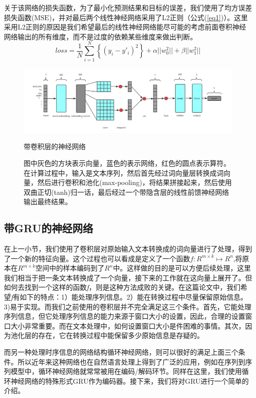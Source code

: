 \documentclass[12pt]{template}
\begin{document}
关于该网络的损失函数，为了最小化预测结果和目标的误差，我们使用了均方误差损失函数($\mathrm{MSE}$)，并对最后两个线性神经网络采用了L2正则（公式(\ref{eq1})）。这里采用L2正则的原因是我们希望最后的线性神经网络能尽可能的考虑前面卷积神经网络输出的所有维度，而不是过度的依赖某些维度来做出判断。
\begin{equation}\label{eq1}
loss=\frac{1}{N}\displaystyle\sum_{i=1}^{N}\left\{(y_i-y'_i)^2\right\}+\alpha||w_0^2||+\beta||w_1^2||
\end{equation}
\begin{figure}[htb]
    \centering
    \includegraphics[width=16cm]{conv_ranker.png}
    \caption{带卷积层的神经网络}
    \captionsetup{font=footnotesize,margin=30pt}\caption*{图中灰色的方块表示向量，蓝色的表示网络，红色的圆点表示算符。在计算过程中，输入是文本序列，然后首先经过词向量层转换成词向量，然后进行卷积和池化(max-pooling)，将结果拼接起来，然后使用双曲正切(tanh)归一话，最后经过一个带隐含层的线性前馈神经网络输出最终结果。}
    \label{f21}
\end{figure} 

\subsection{带GRU的神经网络}
在上一小节，我们使用了卷积层对原始输入文本转换成的词向量进行了处理，得到了一个新的特征向量。这个过程也可以看成是定义了一个函数\(f:R^{m\times k}\mapsto R^n\),将原本在\(R^{m\times k}\)空间中的样本编码到了\(R^n\)中。这样做的目的是可以方便后续处理，这里我们相当于把一条文本转换成了一个向量，接下来的工作就在这向量上展开了。但如何去找到一个这样的函数\textit{f}，则是这种方法成败的关键。在这篇论文中，我们希望\textit{f}有如下的特点：1）能处理序列信息。2）能在转换过程中尽量保留原始信息。3)易于实现。而我们之前使用的卷积层并不完全满足这三个条件。首先，它能处理序列信息，但它处理序列信息的能力来源于窗口大小的设置，因此，合理的设置窗口大小非常重要。而在文本处理中，如何设置窗口大小是件困难的事情。其次，因为池化层的存在，它在转换过程中能保留多少原始信息是存疑的。

而另一种处理时序信息的网络结构循环神经网络，则可以很好的满足上面三个条件。所以近年来这种网络也在自然语言处理上得到了广泛的应用，例如在序列到序列模型中，循环神经网络就常常被用在编码/解码环节。同样在这里，我们使用循环神经网络的特殊形式$\mathrm{GRU}$\cite{DBLP:journals/corr/ChungGCB14}作为编码器。接下来，我们将对GRU进行一个简单的介绍。
\end{document}
